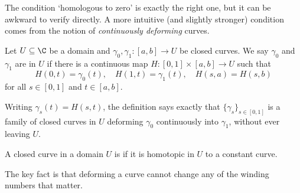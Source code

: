 The condition `homologous to zero' is exactly the right one, but it can be awkward to verify directly. A more intuitive (and slightly stronger) condition comes from the notion of \emph{continuously deforming} curves.

\begin{definition}[Homotopy]
    Let $U \subseteq \C$ be a domain and $\gamma_0, \gamma_1: [a, b] \rightarrow U$ be closed curves. We say $\gamma_0$ and $\gamma_1$ are  in $U$ if there is a continuous map $H: [0, 1] \times [a, b] \rightarrow U$ such that
    $$
    H(0, t) = \gamma_0(t), \quad H(1, t) = \gamma_1(t), \quad H(s, a) = H(s, b)
    $$
    for all $s \in [0, 1]$ and $t \in [a, b]$.
\end{definition}

Writing $\gamma_s(t) = H(s, t)$, the definition says exactly that $\{\gamma_s\}_{s \in [0,1]}$ is a family of closed curves in $U$ deforming $\gamma_0$ continuously into $\gamma_1$, without ever leaving $U$.

\begin{center}
\end{center}

\begin{definition}
    A closed curve in a domain $U$ is  if it is homotopic in $U$ to a constant curve.
\end{definition}

The key fact is that deforming a curve cannot change any of the winding numbers that matter.

